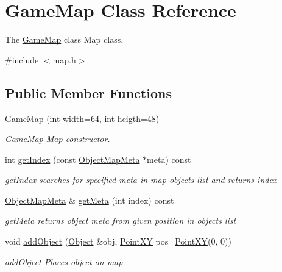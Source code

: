 \hypertarget{classGameMap}{}\section{Game\+Map Class Reference}
\label{classGameMap}


The \hyperlink{classGameMap}{Game\+Map} class Map class.  




{\ttfamily \#include $<$map.\+h$>$}

\subsection*{Public Member Functions}
\begin{DoxyCompactItemize}
\item 
\hyperlink{classGameMap_a094aba2348a0265746326b6c1d1864f2}{Game\+Map} (int \hyperlink{classGameMap_ae9f5144c59e2749104bf8a47f1fd8eb3}{width}=64, int heigth=48)
\begin{DoxyCompactList}\small\item\em \hyperlink{classGameMap}{Game\+Map} Map constructor. \end{DoxyCompactList}\item 
int \hyperlink{classGameMap_a0cfbeb2c0b6a270fc5fa1bcd140743cc}{get\+Index} (const \hyperlink{classObjectMapMeta}{Object\+Map\+Meta} $\ast$meta) const 
\begin{DoxyCompactList}\small\item\em get\+Index searches for specified meta in map objects list and returns index \end{DoxyCompactList}\item 
\hyperlink{classObjectMapMeta}{Object\+Map\+Meta} \& \hyperlink{classGameMap_a3b7cf2fcc2a675b2a66ab304f5d115ad}{get\+Meta} (int index) const 
\begin{DoxyCompactList}\small\item\em get\+Meta returns object meta from given position in objects list \end{DoxyCompactList}\item 
void \hyperlink{classGameMap_a1445fd0bb55e7e4ad9fe3cc780306e2d}{add\+Object} (\hyperlink{classObject}{Object} \&obj, \hyperlink{classPointXY}{Point\+X\+Y} pos=\hyperlink{classPointXY}{Point\+X\+Y}(0, 0))
\begin{DoxyCompactList}\small\item\em add\+Object Places object on map \end{DoxyCompactList}\item 

\end{DoxyCompactItemize}
